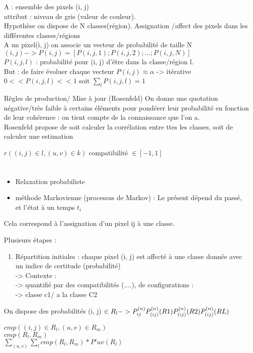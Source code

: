 \documentclass[11pt]{article}
\begin{document}
\vskip 1cm
A : ensemble des pixels (i, j)\\ 
attribut : niveau de gris (valeur de couleur).\\
Hypothèse on dispose de N classes(région). Assignation /affect des pixels dans les différentes classes/régions\\

A un pixel(i, j) on associe un vecteur de probabilité de taille N\\
$(i, j) -> P(i, j) = [P(i, j,1); P(i, j, 2); ...; P(i, j, N)]$\\
$P(i, j, l)$ : probabilité pour (i, j) d'être dans la classe/région l.\\
But : de faire évoluer chaque vecteur $ P(i, j) \approx \alpha$ -> itérative\\
$0 << P(i, j, l) << 1$ soit $ \sum_l P(i, j, l) = 1$

\vskip 1cm 
Règles de production/ Mise à jour (Rosenfeld)
On donne une quotation négative/très faible à certains éléments pour pondérer leur probabilité en fonction de leur cohérence : on tient compte de la connaissance que l'on a.\\
Rosenfeld propose de soit calculer la corrélation entre ttes les classes, soit de calculer une estimation

$r((i, j) \in l, (u, v) \in k)$ compatibilité $\in [-1, 1]$\\


\section{}
\begin{itemize}
	\item Relaxation probabiliste
	\item méthode Markovienne (processus de Markov) : Le présent dépend du passé, et l'état à un temps $t_i$
\end{itemize}
Cela correspond à l'assignation d'un pixel ij à une classe.

\vskip 1cm
Plusieurs étapes :
\begin{enumerate}
	\item Répartition initiales : chaque pixel (i, j) est affecté à une classe donnée avec un indice de certitude (probabilité)\\
		-> Contexte :\\
			-> quantifié par des compatibilités (....), de configurations :\\
			-> classe c1/ a la classe C2\\
\end{enumerate}

On dispose des probabilités (i, j) $\in R_l -> P^{(n)}_{ij} {\\
	P^{(n)}_{(ij)}(R1)\\
	P^{(n)}_{(ij)}(R2)\\
P^{(n)}_{(ij)}(RL)\\}$


$cmp((i, j) \in R_l, (u, v) \in R_m)$\\
$cmp(R_l, R_m)$\\

$\sum_{(u, v)} \sum_l cmp(R_l, R_m) * P'uv(R_l)$


\vskip 2cm
\end{document}
